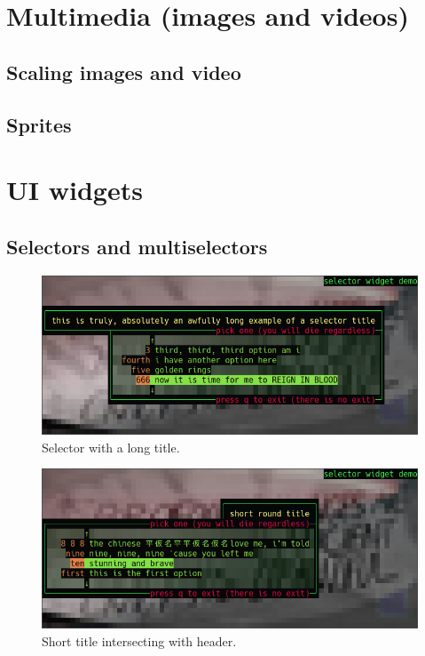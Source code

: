 \documentclass[letterpaper,10pt]{article}
\begin{document}
\section{Multimedia (images and videos)}
\subsection{Scaling images and video}
\subsection{Sprites}

\section{UI widgets}
\label{sec:uiwidgets}
\subsection{Selectors and multiselectors}
\begin{figure}
    \centering
    \includegraphics[width=.75\linewidth]{media/selector1.png}
    \caption{Selector with a long title.}
\end{figure}

\begin{figure}
    \centering
    \includegraphics[width=.75\linewidth]{media/selector2.png}
    \caption{Short title intersecting with header.}
\end{figure}
\end{document}
